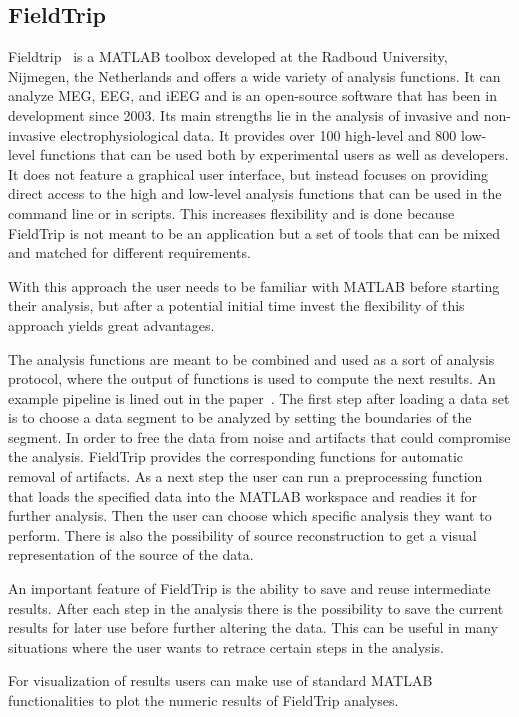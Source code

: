 \subsection{FieldTrip}
Fieldtrip~\cite{fieldtrip} is a MATLAB toolbox developed at the Radboud University,  Nijmegen,  the Netherlands and offers a wide variety of analysis functions.  It can analyze MEG, EEG, and iEEG and is an open-source software that has been in development since 2003. Its main strengths lie in the analysis of invasive and non-invasive electrophysiological data. It provides over 100 high-level and 800 low-level functions that can be used both by experimental users as well as developers. It does not feature a graphical user interface, but instead focuses on providing direct access to the high and low-level analysis functions that can be used in the command line or in scripts.  This increases flexibility and is done because FieldTrip is not meant to be an application but a set of tools that can be mixed and matched for different requirements.

With this approach the user needs to be familiar with MATLAB before starting their analysis, but after a potential initial time invest the flexibility of this approach yields great advantages.

The analysis functions are meant to be combined and used as a sort of analysis protocol, where the output of functions is used to compute the next results. 
An example pipeline is lined out in the paper~\cite{fieldtrip}. The first step after loading a data set is to choose a data segment to be analyzed by setting the boundaries of the segment. In order to free the data from noise and artifacts that could compromise the analysis. FieldTrip provides the corresponding functions for automatic removal of artifacts. As a next step the user can run a preprocessing function that loads the specified data into the MATLAB workspace and readies it for further analysis. Then the user can choose which specific analysis they want to perform. There is also the possibility of source reconstruction to get a visual representation of the source of the data.

An important feature of FieldTrip is the ability to save and reuse intermediate results. After each step in the analysis there is the possibility to save the current results for later use before further altering the data. This can be useful in many situations where the user wants to retrace certain steps in the analysis.

For visualization of results users can make use of standard MATLAB functionalities to plot the numeric results of FieldTrip analyses.


